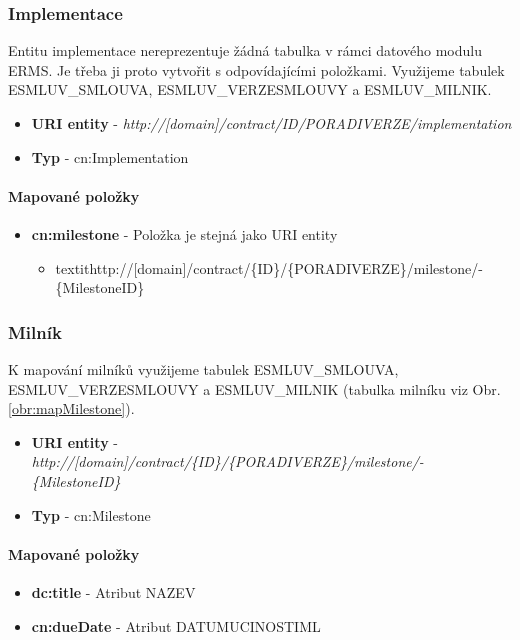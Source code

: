 \subsubsection{Implementace}

Entitu implementace nereprezentuje žádná tabulka v rámci datového modulu ERMS. Je třeba ji proto vytvořit s odpovídajícími položkami. Využijeme tabulek ESMLUV\_SMLOUVA, ESMLUV\_VERZESMLOUVY a ESMLUV\_MILNIK. 

\begin{itemize}
\item \textbf{URI entity} - \textit{http://[domain]/contract/{ID}/{PORADIVERZE}/implementation}
\item \textbf{Typ} - cn:Implementation
\end{itemize}

\paragraph*{Mapované položky}
\begin{itemize}
\item \textbf{cn:milestone} - Položka je stejná jako URI entity
	\begin{itemize}
	\item textit{http://[domain]/contract/\{ID\}/\{PORADIVERZE\}/milestone/- \{MilestoneID\}}
	\end{itemize}
\end{itemize}

\subsubsection{Milník}

K mapování milníků využijeme tabulek ESMLUV\_SMLOUVA, \\ESMLUV\_VERZESMLOUVY a ESMLUV\_MILNIK (tabulka milníku viz Obr. \ref{obr:mapMilestone}).

\begin{itemize}
\item \textbf{URI entity} - \textit{http://[domain]/contract/\{ID\}/\{PORADIVERZE\}/milestone/-
\{MilestoneID\}}
\item \textbf{Typ} - cn:Milestone
\end{itemize}

\paragraph*{Mapované položky}
\begin{itemize}
\item \textbf{dc:title} - Atribut NAZEV
\item \textbf{cn:dueDate} - Atribut DATUMUCINOSTIML
\end{itemize}

